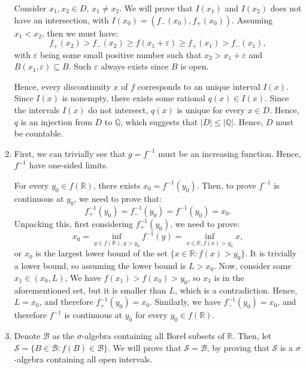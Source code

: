 \begin{enumerate}[label=\textbf{2B.\arabic*}]
  Consider \( x_{1}, x_{2} \in D \), \( x_{1} \neq x_{2} \). We will prove that
  \( I(x_{1}) \) and \( I(x_{2}) \) does not have an intersection, with \(
  I(x_{0}) = (f_{-}(x_{0}), f_{+}(x_{0})) \). Assuming \( x_{1} < x_{2} \), then
  we must have:
  \[
    f_{+}(x_{2}) > f_{-}(x_{2}) \ge f(x_{1} + \varepsilon) \ge f_{+}(x_{1}) >
    f_{-}(x_{1})
  ,\] with \( \varepsilon \) being some small positive number such that \( x_{2}
  > x_{1} + \varepsilon\) and \( B(x_{1}, \varepsilon) \subseteq B \). Such \(
  \varepsilon \) always exists since \( B \) is open.

  Hence, every discontinuity \( x \) of \( f \) corresponds to an unique
  interval \( I(x) \). Since \( I(x) \) is nonempty, there exists some rational
  \( q(x) \in I(x) \). Since the intervals \( I(x) \) do not intersect, \( q(x)
  \) is unique for every \( x \in D \). Hence, \( q \) is an injection from \( D
  \) to \( \mathbb{Q} \), which suggests that \( |D| \le |\mathbb{Q}| \). Hence,
  \( D \) must be countable.
  
\item 
  First, we can trivially see that \( g = f^{-1} \) must be an increasing function.
  Hence, \( f^{-1} \) have one-sided limits.

  For every \( y_{0} \in f(\mathbb{R}) \), there exists \( x_{0} = f^{-1}(y_{0})
  \). Then, to prove \( f^{-1} \) is continuous at \( y_{0} \), we need to prove
  that:
  \[
    f^{-1}_{+}(y_{0}) = f^{-1}_{-}(y_{0}) = f^{-1}(y_{0}) = x_{0}
  .\] 
  Unpacking this, first considering \( f^{-1}_{+}(y_{0}) \), we need to prove:
  \[
    x_{0} = \inf_{y \in f(\mathbb{R}), y > y_{0}} f^{-1}(y) = \inf_{x \in
    \mathbb{R}, f(x) > y_{0}} x
  ,\] or \( x_{0} \) is the largest lower bound of the set \( \{x \in
  \mathbb{R}: f(x) > y_{0}\}   \). It is trivially a lower bound, so assuming
  the lower bound is \( L > x_{0} \). Now,
  consider some \( x_{1} \in (x_{0}, L) \), We have \( f(x_{1}) > f(x_{0}) >
  y_{0} \), so \( x_{1} \) is in the aforementioned set, but it is smaller than
  \( L \), which is a contradiction. Hence, \( L = x_{0} \), and therefore \(
  f^{-1}_{+}(y_{0}) =x_{0} \). Similarly, we have \( f^{-1}_{-}(y_{0}) = x_{0}
  \), and therefore \( f^{-1} \) is continuous at \( y_{0} \) for every \( y_{0}
  \in f(\mathbb{R})\).

\item 
  Denote \( \mathcal{B} \) as the \( \sigma \)-algebra containing all Borel
  subsets of \( \mathbb{R} \). Then, let \( \mathcal{S} = \{B \in \mathcal{B}:
  f(B) \in \mathcal{B}\}   \). We will prove that \( \mathcal{S} = \mathcal{B}
  \), by proving that \( \mathcal{S} \) is a \( \sigma \)-algebra containing all
  open intervals.


\end{enumerate}
